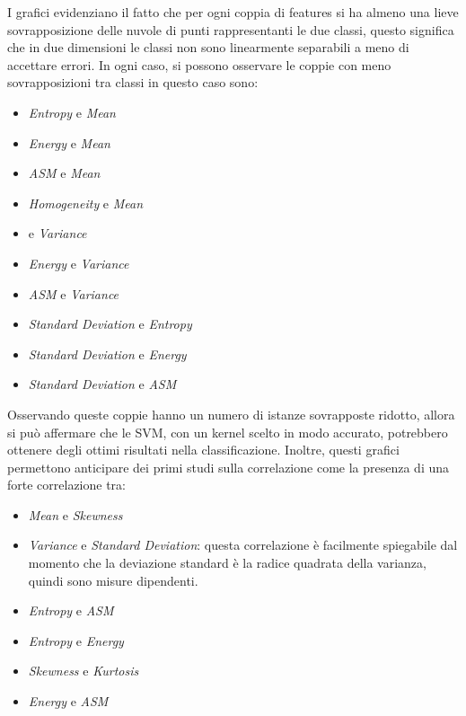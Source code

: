 
I grafici evidenziano il fatto che per ogni coppia di features si ha almeno una
lieve sovrapposizione delle nuvole di punti rappresentanti le due classi, questo
significa che in due dimensioni le classi non sono linearmente separabili a meno
di accettare errori. In ogni caso, si possono osservare le coppie con
meno sovrapposizioni tra classi in questo caso sono:
\begin{itemize}
      \item \textit{Entropy} e \textit{Mean}
      \item \textit{Energy} e \textit{Mean}
      \item \textit{ASM} e \textit{Mean}
      \item \textit{Homogeneity} e \textit{Mean}
      \item {} e \textit{Variance}
      \item \textit{Energy} e \textit{Variance}
      \item \textit{ASM} e \textit{Variance}
      \item \textit{Standard Deviation} e \textit{Entropy}
      \item \textit{Standard Deviation} e \textit{Energy}
      \item \textit{Standard Deviation} e \textit{ASM}
\end{itemize}
Osservando queste coppie hanno un numero di istanze sovrapposte ridotto, allora
si può affermare che le SVM, con un kernel scelto in modo accurato, potrebbero
ottenere degli ottimi risultati nella classificazione. Inoltre, questi grafici
permettono anticipare dei primi studi sulla correlazione come la presenza di una
forte correlazione tra:
\begin{itemize}
      \item \textit{Mean} e \textit{Skewness}
      \item \textit{Variance} e \textit{Standard Deviation}: questa correlazione
            è facilmente spiegabile dal momento che la deviazione standard è la
            radice quadrata della varianza, quindi sono misure dipendenti.
      \item \textit{Entropy} e \textit{ASM}
      \item \textit{Entropy} e \textit{Energy}
      \item \textit{Skewness} e \textit{Kurtosis}
      \item \textit{Energy} e \textit{ASM}
\end{itemize}
